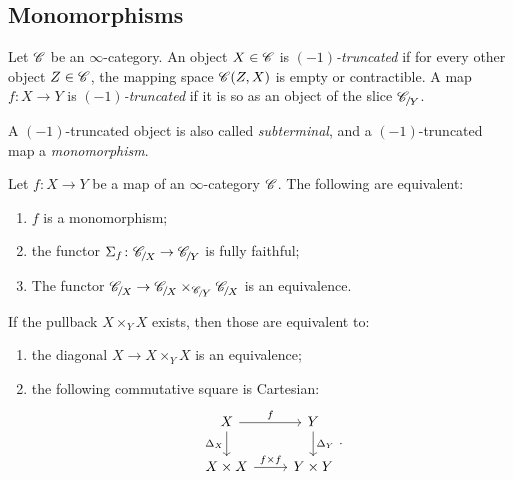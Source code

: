 \documentclass[twoside,a4paper,11pt]{amsart}
\begin{document}
\subsection{Monomorphisms}\label{subsection: monomorphisms}
\begin{definition}
    Let $\mathscr{C}$ be an $\infty$-category. An object $X\in \mathscr{C}$ is \textit{$(-1)$-truncated} if for every other object $Z\in \mathscr{C}$, the mapping space $\mathscr{C}(Z,X)$ is empty or contractible. A map $f\colon X\to Y$ is \textit{$(-1)$-truncated} if it is so as an object of the slice $\slice{\C}{Y}$. 
\end{definition}
\begin{notation}
    A $(-1)$-truncated object is also called \textit{subterminal}, and a $(-1)$-truncated map a \textit{monomorphism}. 
\end{notation}
\begin{prop}\label{prop: characterization monomorphisms}
Let $f\colon X\to Y$ be a map of an $\infty$-category $\mathscr{C}$. The following are equivalent:
\begin{enumerate}[label=\arabic*., ref=\thetheorem.\arabic*]
    \item $f$ is a monomorphism;
    \item\label{prop: characterization monomorphisms 2} the functor $\Sigma_f\colon \slice{\C}{X}\to\slice{\C}{Y}$ is fully faithful;
    \item\label{prop: characterization monomorphisms 3} The functor $\slice{\C}{X}\to\slice{\C}{X}\times_{\slice{\C}{Y}}\slice{\C}{X}$ is an equivalence.
\end{enumerate}
If the pullback $X\times _YX$ exists, then those are equivalent to:
\begin{enumerate}[resume, label=\arabic*., ref=\thetheorem.\arabic*]
    \item\label{prop: characterization monomorphisms 4} the diagonal $X\to X\times_YX$ is an equivalence;
    \item\label{prop: characterization monomorphisms 5} the following commutative square is Cartesian:
\[\begin{tikzcd}
	X & Y \\
	{X\times X} & {Y\times Y}
	\arrow["f", from=1-1, to=1-2]
	\arrow["{\Delta_X}"', from=1-1, to=2-1]
	\arrow["{\Delta_Y}", from=1-2, to=2-2]
	\arrow["{f\times f}", from=2-1, to=2-2]
\end{tikzcd}.\]
\end{enumerate}
\end{prop}
\end{document}
